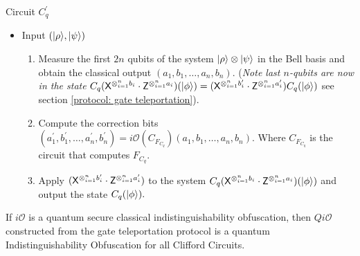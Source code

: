 \begin{algorithm}[H]
\caption{Circuit $C_q^\prime$}
  \begin{itemize}
  \item Input  $\left({\lvert}\rho\rangle, {\lvert}\psi\rangle \right)$
  \begin{enumerate}
  \item  Measure the first $2n$ qubits of the system ${\lvert}\rho\rangle\otimes {\lvert}\psi\rangle$ in the Bell basis and obtain the classical output $(a_1,b_1,\ldots,a_n,b_n).$ ({\em Note last $n$-qubits are now in the state} $C_q({\sf X}^{\otimes_{i=1}^{n} b_{i}} \cdot {\sf Z}^{\otimes_{i=1}^{n} a_{i}})({\lvert}\phi\rangle)=({\sf X}^{\otimes_{i=1}^{n} b_{i}^\prime} \cdot {\sf Z}^{\otimes_{i=1}^{n} a_{i}^\prime})C_q({\lvert}\phi\rangle)$ see section \ref{protocol: gate  teleportation}). 
  \item Compute the correction bits $(a_1^\prime,b_1^\prime,\ldots,a_n^\prime,b_n^\prime)=i\mathcal{O}(C_{F_{C_q}})(a_1,b_1,\ldots,a_n,b_n).$ Where $C_{F_{C_q}}$ is the circuit that computes $F_{C_q}.$
  \item Apply $({\sf X}^{\otimes_{i=1}^{n} b_{i}^\prime} \cdot {\sf Z}^{\otimes_{i=1}^{n} a_{i}^\prime})$ to the system $C_q({\sf X}^{\otimes_{i=1}^{n} b_{i}} \cdot {\sf Z}^{\otimes_{i=1}^{n} a_{i}})({\lvert}\phi\rangle)$  and output the state $C_q({\lvert}\phi\rangle).$
  \end{enumerate}
  \end{itemize} 
\end{algorithm}

\begin{theorem}
If $i\mathcal{O}$ is a quantum secure classical indistinguishability obfuscation, then $Qi\mathcal{O}$ constructed from the gate teleportation protocol is a quantum Indistinguishability Obfuscation for all Clifford Circuits.
\end{theorem}

